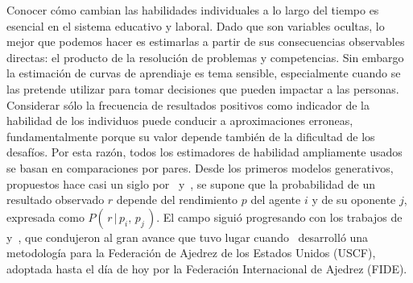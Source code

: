 \documentclass[a4paper,11pt]{book}
\theoremstyle{definition}
\begin{document}
Conocer c\'omo cambian las habilidades individuales a lo largo del tiempo es esencial en el sistema educativo y laboral.
%
Dado que son variables ocultas, lo mejor que podemos hacer es estimarlas a partir de sus consecuencias observables directas: el producto de la resoluci\'on de problemas y competencias.
%
Sin embargo la estimaci\'on de curvas de aprendiaje es tema sensible, especialmente cuando se las pretende utilizar para tomar decisiones que pueden impactar a las personas.
%
Considerar s\'olo la frecuencia de resultados positivos como indicador de la habilidad de los individuos puede conducir a aproximaciones erroneas, fundamentalmente porque su valor depende tambi\'en de la dificultad de los desaf\'ios.
%
Por esta raz\'on, todos los estimadores de habilidad ampliamente usados se basan en comparaciones por pares.
%
Desde los primeros modelos generativos, propuestos hace casi un siglo por~\cite{Thurstone1927} y~\cite{Zermelo1929}, se supone que la probabilidad de un resultado observado $r$ depende del rendimiento $p$ del agente $i$ y de su oponente $j$, expresada como $P(\, r \,|\, p_i, \, p_j \,)$.
%
El campo sigui\'o progresando con los trabajos de \cite{Bradley1952} y~\cite{Mosteller1951a,Mosteller1951b,Mosteller1951c}, que condujeron al gran avance que tuvo lugar cuando~\cite{Elo2008} desarroll\'o una metodología para la Federaci\'on de Ajedrez de los Estados Unidos (USCF), adoptada hasta el d\'ia de hoy por la Federaci\'on Internacional de Ajedrez (FIDE).

\end{document}
